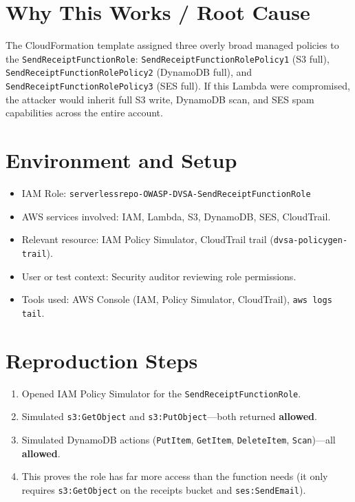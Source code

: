 \documentclass[12pt]{report}
\begin{document}
\section{Why This Works / Root Cause}
The CloudFormation template assigned three overly broad managed policies to the \texttt{SendReceiptFunctionRole}: \texttt{SendReceiptFunctionRolePolicy1} (S3 full), \texttt{SendReceiptFunctionRolePolicy2} (DynamoDB full), and \texttt{SendReceiptFunctionRolePolicy3} (SES full). If this Lambda were compromised, the attacker would inherit full S3 write, DynamoDB scan, and SES spam capabilities across the entire account.

\section{Environment and Setup}
\begin{itemize}
  \item IAM Role: \texttt{serverlessrepo-OWASP-DVSA-SendReceiptFunctionRole}
  \item AWS services involved: IAM, Lambda, S3, DynamoDB, SES, CloudTrail.
  \item Relevant resource: IAM Policy Simulator, CloudTrail trail (\texttt{dvsa-policygen-trail}).
  \item User or test context: Security auditor reviewing role permissions.
  \item Tools used: AWS Console (IAM, Policy Simulator, CloudTrail), \texttt{aws logs tail}.
\end{itemize}

\section{Reproduction Steps}
\begin{enumerate}
  \item Opened IAM Policy Simulator for the \texttt{SendReceiptFunctionRole}.
  \item Simulated \texttt{s3:GetObject} and \texttt{s3:PutObject}---both returned \textbf{allowed}.
  \item Simulated DynamoDB actions (\texttt{PutItem}, \texttt{GetItem}, \texttt{DeleteItem}, \texttt{Scan})---all \textbf{allowed}.
  \item This proves the role has far more access than the function needs (it only requires \texttt{s3:GetObject} on the receipts bucket and \texttt{ses:SendEmail}).
\end{enumerate}
\end{document}
